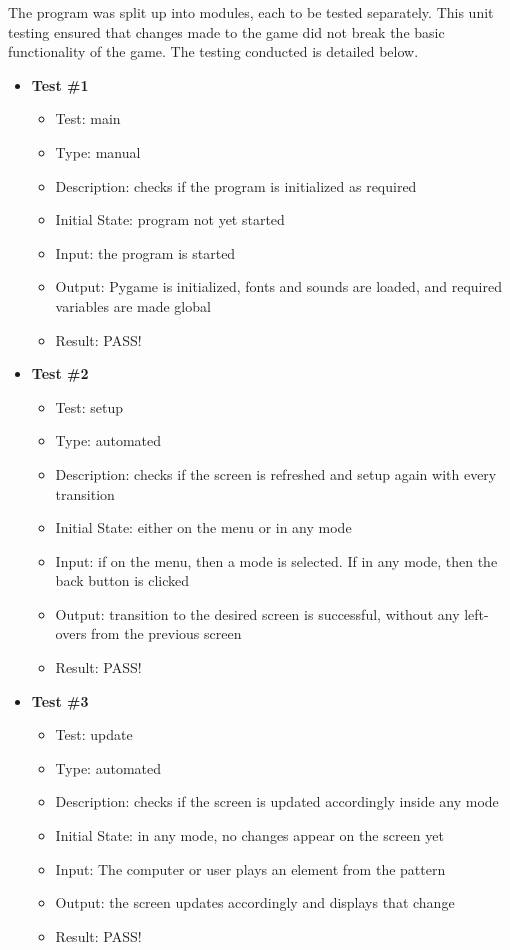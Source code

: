 \documentclass[12pt, titlepage]{article}
\begin{document}
\par The program was split up into modules, each to be tested separately. This unit testing ensured that changes made to the game did not break the basic functionality of the game. The testing conducted is detailed below.

\begin{itemize}

\item \textbf {Test \#1}
\begin{itemize}
\item{Test: main}
\item{Type: manual}
\item{Description: checks if the program is initialized as required}
\item{Initial State: program not yet started}
\item{Input: the program is started}
\item{Output: Pygame is initialized, fonts and sounds are loaded, and required variables are made global}
\item{Result: PASS!}
\end{itemize}

\item \textbf {Test \#2}
\begin{itemize}
\item{Test: setup}
\item{Type: automated}
\item{Description: checks if the screen is refreshed and setup again with every transition}
\item{Initial State: either on the menu or in any mode}
\item{Input: if on the menu, then a mode is selected. If in any mode, then the back button is clicked}
\item{Output: transition to the desired screen is successful, without any left-overs from the previous screen}
\item{Result: PASS!}
\end{itemize}

\item \textbf {Test \#3}
\begin{itemize}
\item{Test: update}
\item{Type: automated}
\item{Description: checks if the screen is updated accordingly inside any mode}
\item{Initial State: in any mode, no changes appear on the screen yet}
\item{Input: The computer or user plays an element from the pattern}
\item{Output: the screen updates accordingly and displays that change}
\item{Result: PASS!}
\end{itemize}


\end{itemize}
\end{document}

